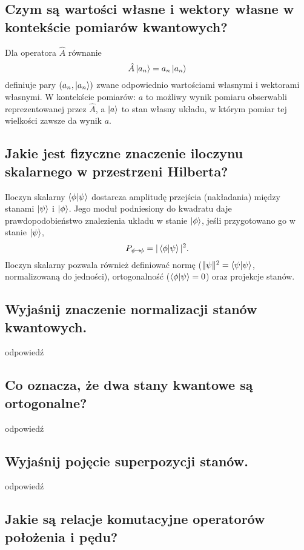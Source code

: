 \subsection{Czym są wartości własne i wektory własne w kontekście pomiarów kwantowych?}

Dla operatora $\hat A$ równanie
$$
\hat A\ket{a_n}=a_n\ket{a_n}
$$
definiuje pary $(a_n,\ket{a_n})$ zwane odpowiednio wartościami własnymi i wektorami własnymi. W kontekście pomiarów: $ a $ to możliwy wynik pomiaru obserwabli reprezentowanej przez $ \hat{A} $, a $ \ket{a} $ to stan własny układu, w którym pomiar tej wielkości zawsze da wynik $ a $.

\subsection{Jakie jest fizyczne znaczenie iloczynu skalarnego w przestrzeni Hilberta?}

Iloczyn skalarny $\braket{\phi}{\psi}$ dostarcza amplitudę przejścia (nakładania) między stanami $\ket{\psi}$ i $\ket{\phi}$. Jego moduł podniesiony do kwadratu daje prawdopodobieństwo znalezienia układu w stanie $\ket{\phi}$, jeśli przygotowano go w stanie $\ket{\psi}$,
$$
P_{\psi\!\to\!\phi}=|\braket{\phi}{\psi}|^{2}.
$$
Iloczyn skalarny pozwala również definiować normę ($\|\psi\|^{2}=\braket{\psi}{\psi}$, normalizowaną do jedności), ortogonalność ($\braket{\phi}{\psi}=0$) oraz projekcje stanów.

\subsection{Wyjaśnij znaczenie normalizacji stanów kwantowych.}

odpowiedź

\subsection{Co oznacza, że dwa stany kwantowe są ortogonalne?}

odpowiedź

\subsection{Wyjaśnij pojęcie superpozycji stanów.}

odpowiedź

\subsection{Jakie są relacje komutacyjne operatorów położenia i pędu?}

